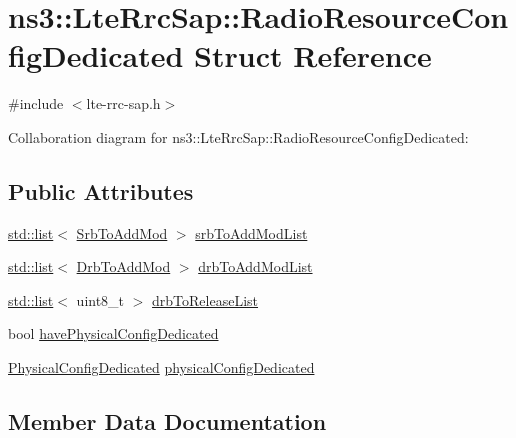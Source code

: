 \hypertarget{structns3_1_1LteRrcSap_1_1RadioResourceConfigDedicated}{}\section{ns3\+:\+:Lte\+Rrc\+Sap\+:\+:Radio\+Resource\+Config\+Dedicated Struct Reference}
\label{structns3_1_1LteRrcSap_1_1RadioResourceConfigDedicated}


{\ttfamily \#include $<$lte-\/rrc-\/sap.\+h$>$}



Collaboration diagram for ns3\+:\+:Lte\+Rrc\+Sap\+:\+:Radio\+Resource\+Config\+Dedicated\+:
\subsection*{Public Attributes}
\begin{DoxyCompactItemize}
\item 
\hyperlink{openflow-interface_8h_afd9bcfa176617760671b67580f536fa7}{std\+::list}$<$ \hyperlink{structns3_1_1LteRrcSap_1_1SrbToAddMod}{Srb\+To\+Add\+Mod} $>$ \hyperlink{structns3_1_1LteRrcSap_1_1RadioResourceConfigDedicated_ae5fcfd17974bfa04fce84b6ba46cb47b}{srb\+To\+Add\+Mod\+List}
\item 
\hyperlink{openflow-interface_8h_afd9bcfa176617760671b67580f536fa7}{std\+::list}$<$ \hyperlink{structns3_1_1LteRrcSap_1_1DrbToAddMod}{Drb\+To\+Add\+Mod} $>$ \hyperlink{structns3_1_1LteRrcSap_1_1RadioResourceConfigDedicated_ac9201f61eb6cdcc64064f6be6e04cac8}{drb\+To\+Add\+Mod\+List}
\item 
\hyperlink{openflow-interface_8h_afd9bcfa176617760671b67580f536fa7}{std\+::list}$<$ uint8\+\_\+t $>$ \hyperlink{structns3_1_1LteRrcSap_1_1RadioResourceConfigDedicated_a2828f77c993322793cb4b19cf5cf7cd3}{drb\+To\+Release\+List}
\item 
bool \hyperlink{structns3_1_1LteRrcSap_1_1RadioResourceConfigDedicated_ab86be2addf52373c0edf3545f06a627e}{have\+Physical\+Config\+Dedicated}
\item 
\hyperlink{structns3_1_1LteRrcSap_1_1PhysicalConfigDedicated}{Physical\+Config\+Dedicated} \hyperlink{structns3_1_1LteRrcSap_1_1RadioResourceConfigDedicated_a1832a9a12892edeba8a7ddecdfab9b0d}{physical\+Config\+Dedicated}
\end{DoxyCompactItemize}


\subsection{Member Data Documentation}
